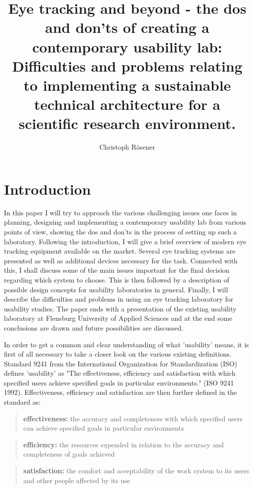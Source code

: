 \documentclass[output=paper]{langsci/langscibook}
\author{%
 Christoph Rösener
\affiliation{Johannes Gutenberg University of Mainz/Germersheim}
}
\title{Eye tracking and beyond - the dos and don'ts of creating a contemporary usability lab: {D}ifficulties and problems relating to implementing a sustainable technical architecture for a scientific research environment.}
\begin{document}
\section{Introduction}

In this paper I will try to approach the various challenging issues one faces in planning, designing and implementing a contemporary usability lab from various points of view, showing the dos and don'ts in the process of setting up such a laboratory. Following the introduction, I will give a brief overview of modern eye tracking equipment available on the market. Several eye tracking systems are presented as well as additional devices necessary for the task. Connected with this, I shall discuss some of the main issues important for the final decision regarding which system to choose. This is then followed by a description of possible design concepts for usability laboratories in general. Finally, I will describe the difficulties and problems in using an eye tracking laboratory for usability studies. The paper ends with a presentation of the existing usability laboratory at Flensburg University of Applied Sciences and at the end some conclusions are drawn and future possibilities are discussed.


In order to get a common and clear understanding of what 'usability' means, it is first of all necessary to take a closer look on the various existing definitions. Standard 9241 from the International Organization for Standardization (ISO) defines 'usability' as "The effectiveness, efficiency and satisfaction with which specified users achieve specified goals in particular environments." (ISO 9241 1992). Effectiveness, efficiency and satisfaction are then further defined in the standard as: 


\begin{quote}
\textbf{effectiveness: }the accuracy and completeness with which specified users can achieve specified goals in particular environments
\end{quote}

\begin{quote}
\textbf{efficiency:} the resources expended in relation to the accuracy and completeness of goals achieved
\end{quote}

\begin{quote}
\textbf{satisfaction:} the comfort and acceptability of the work system to its users and other people affected by its use
\end{quote}
\end{document}

